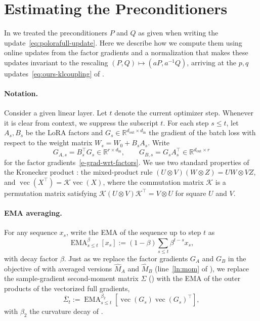 \documentclass[11pt]{article}
\renewcommand{\vec}{\operatorname{vec}}
\newcommand{\R}{\mathbb{R}}
\DeclareMathOperator{\EMA}{EMA}
\theoremstyle{plain}
\theoremstyle{definition}
\theoremstyle{remark}
\theoremstyle{definition}
\begin{document}
\section{Estimating the Preconditioners}
\label{app:matnormal}
In  we treated the preconditioners $P$ and $Q$ as given when writing the update~\eqref{eq:polorafull-update}. Here we describe how we compute them using online updates from the factor gradients and a normalization that makes these updates invariant to the rescaling $(P,Q)\mapsto(aP,a^{-1}Q)$, arriving at the $p,q$ updates~\eqref{eq:ours-klcoupling} of .

\paragraph{Notation.} Consider a given linear layer. Let $t$ denote the current optimizer step. Whenever it is clear from context, we suppress the subscript $t$. For each step $s\le t$,
let $A_s,B_s$ be the LoRA factors and
$G_s\in\R^{d_{\mathrm{out}}\times d_{\mathrm{in}}}$ the gradient of the batch loss with respect to the weight matrix $W_s=W_0+B_sA_s$. Write
\[
  G_{A,s}=B_s^\top G_s\in\R^{r\times d_{\mathrm{in}}},\qquad
  G_{B,s}=G_sA_s^\top\in\R^{d_{\mathrm{out}}\times r}
\]
for the factor
gradients~\eqref{e-grad-wrt-factors}. We use two standard properties of the Kronecker product \cite{magnus2019matrix}: the mixed-product rule $(U \otimes V)(W \otimes Z) = UW \otimes VZ$, and $\vec(X^\top)=\mathcal{K}\vec(X)$, where the commutation matrix $\mathcal{K}$ is a permutation matrix satisfying $\mathcal{K}(U \otimes V)\mathcal{K}^\top = V \otimes U$ for square $U$ and $V$.

\paragraph{EMA averaging.} For any sequence $x_s$, write the EMA of the sequence up to step $t$ as
\[
  \EMA^{\beta}_{s\le t}[x_s]:=(1-\beta)\sum_{s\le t}\beta^{t-s} x_s,
\]
with decay factor $\beta$. Just as we replace the factor gradients $G_A$ and $G_B$ in the objective of  with averaged versions $\widehat M_A$ and $\widehat M_B$ (line~\ref{ln:mom} of ), we replace the sample-gradient second-moment matrix $\Sigma$ () with the EMA of the outer products of the vectorized full gradients,
\[
  \overline \Sigma_t:=\EMA^{\beta_2}_{s\le t}[\vec(G_s) \vec(G_s)^\top],
\]
with $\beta_2$ the curvature decay of .
\end{document}
